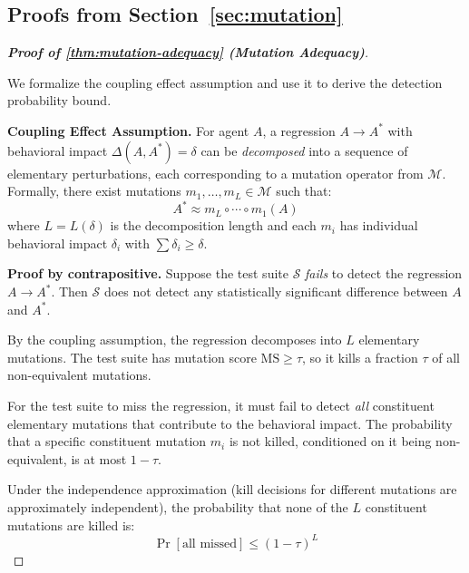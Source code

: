 
\subsection{Proofs from Section~\ref{sec:mutation}}
\label{app:proofs:mutation}

\begin{proof}[\textbf{Proof of \cref{thm:mutation-adequacy} (Mutation Adequacy)}]
\label{app:proof:mutation}

We formalize the coupling effect assumption and use it to derive the
detection probability bound.

\textbf{Coupling Effect Assumption.} For agent $A$, a regression
$A \to A^*$ with behavioral impact $\Delta(A, A^*) = \delta$ can be
\emph{decomposed} into a sequence of elementary perturbations, each
corresponding to a mutation operator from $\mathcal{M}$. Formally,
there exist mutations $m_1, \ldots, m_L \in \mathcal{M}$ such that:
\begin{equation}
  A^* \approx m_L \circ \cdots \circ m_1(A)
\end{equation}
where $L = L(\delta)$ is the decomposition length and each
$m_i$ has individual behavioral impact $\delta_i$ with
$\sum \delta_i \geq \delta$.

\textbf{Proof by contrapositive.} Suppose the test suite $\mathcal{S}$
\emph{fails} to detect the regression $A \to A^*$. Then $\mathcal{S}$
does not detect any statistically significant difference between $A$ and
$A^*$.

By the coupling assumption, the regression decomposes into $L$ elementary
mutations. The test suite has mutation score $\text{MS} \geq \tau$, so
it kills a fraction $\tau$ of all non-equivalent mutations.

For the test suite to miss the regression, it must fail to detect
\emph{all} constituent elementary mutations that contribute to the
behavioral impact. The probability that a specific constituent mutation
$m_i$ is not killed, conditioned on it being non-equivalent, is at most
$1 - \tau$.

Under the independence approximation (kill decisions for different
mutations are approximately independent), the probability that none of
the $L$ constituent mutations are killed is:
\begin{equation}
  \Pr[\text{all missed}] \leq (1-\tau)^L
\end{equation}


\end{proof}
